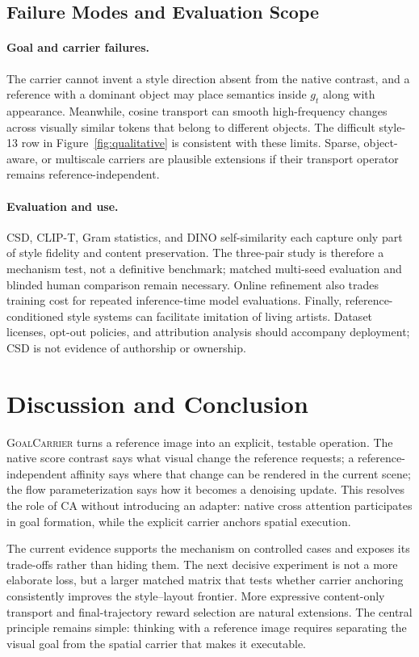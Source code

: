 \documentclass[10pt,letterpaper]{article}
\newcommand{\method}{\textsc{GoalCarrier}}
\begin{document}
\subsection{Failure Modes and Evaluation Scope}

\paragraph{Goal and carrier failures.}
The carrier cannot invent a style direction absent from the native contrast,
and a reference with a dominant object may place semantics inside $g_t$ along
with appearance. Meanwhile, cosine transport can smooth high-frequency changes
across visually similar tokens that belong to different objects. The difficult
style-13 row in Figure~\ref{fig:qualitative} is consistent with these limits.
Sparse, object-aware, or multiscale carriers are plausible extensions if their
transport operator remains reference-independent.

\paragraph{Evaluation and use.}
CSD, CLIP-T, Gram statistics, and DINO self-similarity each capture only part of
style fidelity and content preservation. The three-pair study is therefore a
mechanism test, not a definitive benchmark; matched multi-seed evaluation and
blinded human comparison remain necessary. Online refinement also trades
training cost for repeated inference-time model evaluations. Finally,
reference-conditioned style systems can facilitate imitation of living
artists. Dataset licenses, opt-out policies, and attribution analysis should
accompany deployment; CSD is not evidence of authorship or ownership.

\section{Discussion and Conclusion}

\method{} turns a reference image into an explicit, testable operation. The
native score contrast says what visual change the reference requests; a
reference-independent affinity says where that change can be rendered in the
current scene; the flow parameterization says how it becomes a denoising
update. This resolves the role of CA without introducing an adapter: native
cross attention participates in goal formation, while the explicit carrier
anchors spatial execution.

The current evidence supports the mechanism on controlled cases and exposes
its trade-offs rather than hiding them. The next decisive experiment is not a
more elaborate loss, but a larger matched matrix that tests whether carrier
anchoring consistently improves the style--layout frontier. More expressive
content-only transport and final-trajectory reward selection are natural
extensions. The central principle remains simple: thinking with a reference
image requires separating the visual goal from the spatial carrier that makes
it executable.

\clearpage



\clearpage

\end{document}
